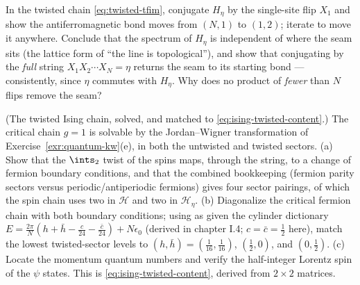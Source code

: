 \begin{exercise}[easy]
\label{exr:move-the-seam}
In the twisted chain \eqref{eq:twisted-tfim}, conjugate $H_\eta$ by the
single-site flip $X_1$ and show the antiferromagnetic bond moves from
$(N,1)$ to $(1,2)$; iterate to move it anywhere. Conclude that the
spectrum of $H_\eta$ is independent of where the seam sits (the lattice
form of ``the line is topological''), and show that conjugating by the
\emph{full} string $X_1 X_2 \cdots X_N = \eta$ returns the seam to its
starting bond --- consistently, since $\eta$ commutes with $H_\eta$.
Why does no product of \emph{fewer} than $N$ flips remove the seam?
\end{exercise}

\begin{exercise}[thinker]
\label{exr:twisted-spectrum}
(The twisted Ising chain, solved, and matched to
\eqref{eq:ising-twisted-content}.) The critical chain $g = 1$ is
solvable by the Jordan--Wigner transformation of
Exercise~\ref{exr:quantum-kw}(e), in both the untwisted and twisted
sectors. (a) Show that the $\ints_2$ twist of the spins maps, through
the string, to a change of fermion boundary conditions, and that the
combined bookkeeping (fermion parity sectors versus
periodic/antiperiodic fermions) gives four sector pairings, of which
the spin chain uses two in $\mathcal H$ and two in $\mathcal H_\eta$.
(b) Diagonalize the critical fermion chain with both boundary
conditions; using as given the cylinder dictionary $E = \frac{2\pi}{N}
\left(h + \bar h - \frac{c}{24} - \frac{\bar c}{24}\right) + N
\epsilon_0$ (derived in chapter I.4; $c = \bar c = \frac12$ here),
match the lowest twisted-sector levels to $(h,\bar h) =
(\frac1{16},\frac1{16})$, $(\frac12, 0)$, and $(0,\frac12)$. (c)
Locate the momentum quantum numbers and verify the half-integer
Lorentz spin of the $\psi$ states. This is
\eqref{eq:ising-twisted-content}, derived from $2\times2$ matrices.
\end{exercise}

